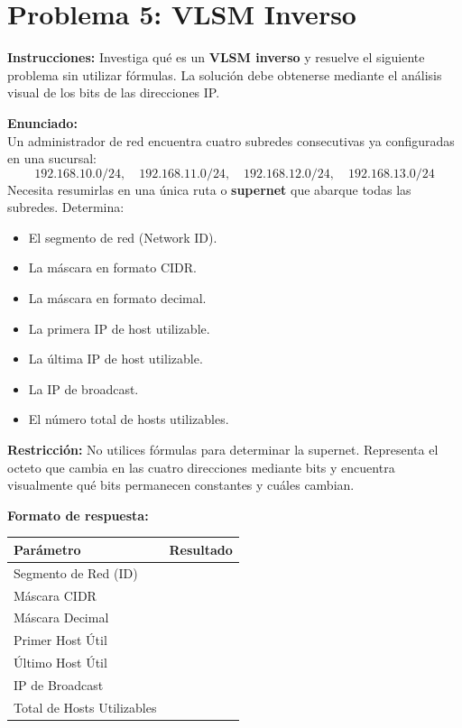 \section{Problema 5: VLSM Inverso}

\begin{tcolorbox}[enunciado]
\textbf{Instrucciones:} Investiga qué es un \textbf{VLSM inverso} y resuelve el siguiente problema sin utilizar fórmulas. La solución debe obtenerse mediante el análisis visual de los bits de las direcciones IP.

\textbf{Enunciado:}\\
Un administrador de red encuentra cuatro subredes consecutivas ya configuradas en una sucursal:
\[
192.168.10.0/24, \quad 192.168.11.0/24, \quad 192.168.12.0/24, \quad 192.168.13.0/24
\]
Necesita resumirlas en una única ruta o \textbf{supernet} que abarque todas las subredes. Determina:
\begin{itemize}[leftmargin=*]
    \item El segmento de red (Network ID).
    \item La máscara en formato CIDR.
    \item La máscara en formato decimal.
    \item La primera IP de host utilizable.
    \item La última IP de host utilizable.
    \item La IP de broadcast.
    \item El número total de hosts utilizables.
\end{itemize}

\textbf{Restricción:} No utilices fórmulas para determinar la supernet. Representa el octeto que cambia en las cuatro direcciones mediante bits y encuentra visualmente qué bits permanecen constantes y cuáles cambian.

\textbf{Formato de respuesta:}
\vspace{0.3cm}
\begin{center}
    \begin{tabular}{lp{8cm}}
    \toprule
    \textbf{Parámetro} & \textbf{Resultado} \\
    \midrule
    Segmento de Red (ID) & \\
    Máscara CIDR & \\
    Máscara Decimal & \\
    Primer Host Útil & \\
    Último Host Útil & \\
    IP de Broadcast & \\
    Total de Hosts Utilizables & \\
    \bottomrule
    \end{tabular}
\end{center}
\vspace{0.3cm}


\end{tcolorbox}
